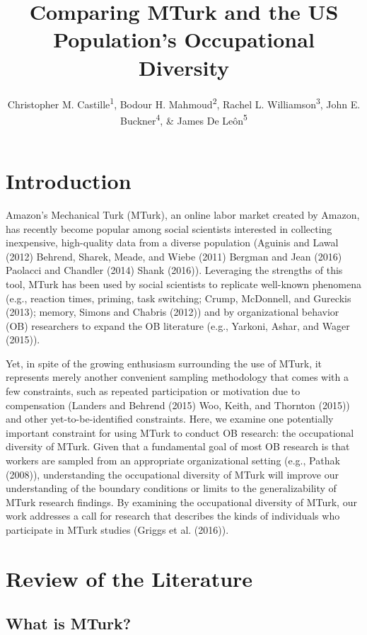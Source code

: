 \documentclass[english,man]{apa6}
\title{Comparing MTurk and the US Population's Occupational Diversity}
\author{Christopher M. Castille\textsuperscript{1}, Bodour H. Mahmoud\textsuperscript{2}, Rachel L. Williamson\textsuperscript{3}, John E. Buckner\textsuperscript{4}, \& James De Leôn\textsuperscript{5}}
\affiliation{
    \vspace{0.5cm}
          \textsuperscript{1} Nicholls State University\\
          \textsuperscript{2} Villanova University\\
          \textsuperscript{3} University of Georgia\\
          \textsuperscript{4} AlixPartners\\
          \textsuperscript{5} APT Metrics  }
\theoremstyle{definition}
\theoremstyle{definition}
\theoremstyle{remark}
\begin{document}
\maketitle

\setcounter{secnumdepth}{0}



\section{Introduction}\label{introduction}

Amazon's Mechanical Turk (MTurk), an online labor market created by
Amazon, has recently become popular among social scientists interested
in collecting inexpensive, high-quality data from a diverse population
(Aguinis and Lawal (2012) Behrend, Sharek, Meade, and Wiebe (2011)
Bergman and Jean (2016) Paolacci and Chandler (2014) Shank (2016)).
Leveraging the strengths of this tool, MTurk has been used by social
scientists to replicate well-known phenomena (e.g., reaction times,
priming, task switching; Crump, McDonnell, and Gureckis (2013); memory,
Simons and Chabris (2012)) and by organizational behavior (OB)
researchers to expand the OB literature (e.g., Yarkoni, Ashar, and Wager
(2015)).

Yet, in spite of the growing enthusiasm surrounding the use of MTurk, it
represents merely another convenient sampling methodology that comes
with a few constraints, such as repeated participation or motivation due
to compensation (Landers and Behrend (2015) Woo, Keith, and Thornton
(2015)) and other yet-to-be-identified constraints. Here, we examine one
potentially important constraint for using MTurk to conduct OB research:
the occupational diversity of MTurk. Given that a fundamental goal of
most OB research is that workers are sampled from an appropriate
organizational setting (e.g., Pathak (2008)), understanding the
occupational diversity of MTurk will improve our understanding of the
boundary conditions or limits to the generalizability of MTurk research
findings. By examining the occupational diversity of MTurk, our work
addresses a call for research that describes the kinds of individuals
who participate in MTurk studies (Griggs et al. (2016)).

\section{Review of the Literature}\label{review-of-the-literature}

\subsection{What is MTurk?}\label{what-is-mturk}
\end{document}
